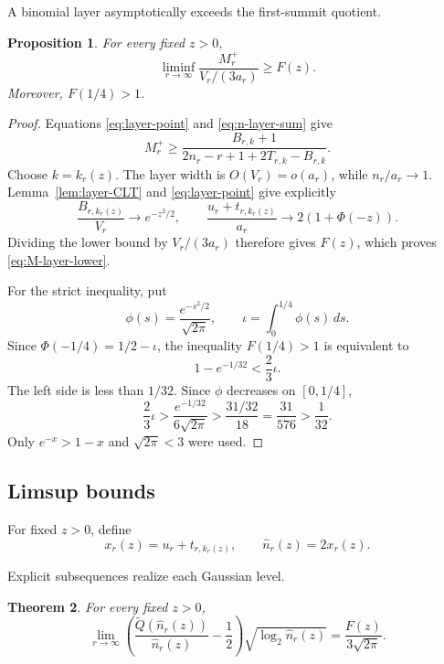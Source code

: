 \documentclass[11pt]{article}
\newtheorem{theorem}{Theorem}[section]
\newtheorem{proposition}[theorem]{Proposition}
\theoremstyle{definition}
\theoremstyle{remark}
\newcommand{\Qt}{\widetilde Q}
\begin{document}
A binomial layer asymptotically exceeds the first-summit quotient.
\begin{proposition}
\label{prop:layer-enhancement}
For every fixed \(z>0\),
\begin{equation}
\label{eq:M-layer-lower}
 \liminf_{r\to\infty}
 \frac{M_r^+}{V_r/(3a_r)}\geq F(z).
\end{equation}
Moreover, \(F(1/4)>1\).
\end{proposition}

\begin{proof}
Equations \eqref{eq:layer-point} and \eqref{eq:n-layer-sum} give
\[
 M_r^+\geq
 \frac{B_{r,k}+1}
 {2n_r-r+1+2T_{r,k}-B_{r,k}}.
\]
Choose \(k=k_r(z)\).  The layer width is \(O(V_r)=o(a_r)\), while
\(n_r/a_r\to1\).  Lemma~\ref{lem:layer-CLT} and
\eqref{eq:layer-point} give explicitly
\[
 \frac{B_{r,k_r(z)}}{V_r}\longrightarrow e^{-z^2/2},
 \qquad
 \frac{u_r+t_{r,k_r(z)}}{a_r}
 \longrightarrow2(1+\Phi(-z)).
\]
Dividing the lower bound by \(V_r/(3a_r)\) therefore gives \(F(z)\), which
proves \eqref{eq:M-layer-lower}.

For the strict inequality, put
\[
 \phi(s)=\frac{e^{-s^2/2}}{\sqrt{2\pi}},
 \qquad \iota=\int_0^{1/4}\phi(s)\,ds.
\]
Since \(\Phi(-1/4)=1/2-\iota\), the inequality \(F(1/4)>1\) is equivalent to
\[
 1-e^{-1/32}<\frac23\iota.
\]
The left side is less than \(1/32\).  Since \(\phi\) decreases on
\([0,1/4]\),
\[
 \frac23\iota>
 \frac{e^{-1/32}}{6\sqrt{2\pi}}
 >\frac{31/32}{18}
 =\frac{31}{576}
 >\frac1{32}.
\]
Only \(e^{-x}>1-x\) and \(\sqrt{2\pi}<3\) were used.
\end{proof}

\subsection{Limsup bounds}

For fixed \(z>0\), define
\begin{equation}
\label{eq:x-r-z}
 x_r(z)=u_r+t_{r,k_r(z)},
 \qquad \widehat n_r(z)=2x_r(z).
\end{equation}

Explicit subsequences realize each Gaussian level.
\begin{theorem}
\label{thm:layer-subsequences}
For every fixed \(z>0\),
\begin{equation*}
 \lim_{r\to\infty}
 \left(\frac{\Qt(\widehat n_r(z))}{\widehat n_r(z)}-\frac12\right)
 \sqrt{\log_2 \widehat n_r(z)}
 =\frac{F(z)}{3\sqrt{2\pi}}.
\end{equation*}
\end{theorem}
\end{document}
